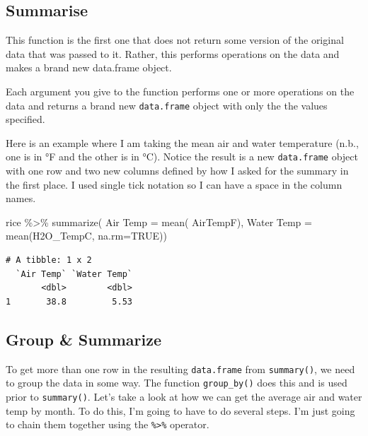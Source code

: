 \documentclass[
  letterpaper,
]{book}
\newenvironment{Shaded}{\begin{snugshade}}{\end{snugshade}}
\newcommand{\AttributeTok}[1]{\textcolor[rgb]{0.40,0.45,0.13}{#1}}
\newcommand{\ConstantTok}[1]{\textcolor[rgb]{0.56,0.35,0.01}{#1}}
\newcommand{\FunctionTok}[1]{\textcolor[rgb]{0.28,0.35,0.67}{#1}}
\newcommand{\NormalTok}[1]{\textcolor[rgb]{0.00,0.23,0.31}{#1}}
\newcommand{\OtherTok}[1]{\textcolor[rgb]{0.00,0.23,0.31}{#1}}
\newcommand{\SpecialCharTok}[1]{\textcolor[rgb]{0.37,0.37,0.37}{#1}}
\newcommand{\StringTok}[1]{\textcolor[rgb]{0.13,0.47,0.30}{#1}}
\begin{document}
\subsection{Summarise}\label{summarise}

This function is the first one that does not return some version of the
original data that was passed to it. Rather, this performs operations on
the data and makes a brand new data.frame object.

Each argument you give to the function performs one or more operations
on the data and returns a brand new \texttt{data.frame} object with only
the the values specified.

Here is an example where I am taking the mean air and water temperature
(n.b., one is in °F and the other is in °C). Notice the result is a new
\texttt{data.frame} object with one row and two new columns defined by
how I asked for the summary in the first place. I used single tick
notation so I can have a space in the column names.

\begin{Shaded}
\begin{Highlighting}[]
\NormalTok{rice }\SpecialCharTok{\%\textgreater{}\%}
  \FunctionTok{summarize}\NormalTok{( }\StringTok{\textasciigrave{}}\AttributeTok{Air Temp}\StringTok{\textasciigrave{}} \OtherTok{=} \FunctionTok{mean}\NormalTok{( AirTempF), }
             \StringTok{\textasciigrave{}}\AttributeTok{Water Temp}\StringTok{\textasciigrave{}} \OtherTok{=} \FunctionTok{mean}\NormalTok{(H2O\_TempC, }\AttributeTok{na.rm=}\ConstantTok{TRUE}\NormalTok{))}
\end{Highlighting}
\end{Shaded}

\begin{verbatim}
# A tibble: 1 x 2
  `Air Temp` `Water Temp`
       <dbl>        <dbl>
1       38.8         5.53
\end{verbatim}

\subsection{Group \& Summarize}\label{group-summarize}

To get more than one row in the resulting \texttt{data.frame} from
\texttt{summary()}, we need to group the data in some way. The function
\texttt{group\_by()} does this and is used prior to \texttt{summary()}.
Let's take a look at how we can get the average air and water temp by
month. To do this, I'm going to have to do several steps. I'm just going
to chain them together using the \texttt{\%\textgreater{}\%} operator.
\end{document}
